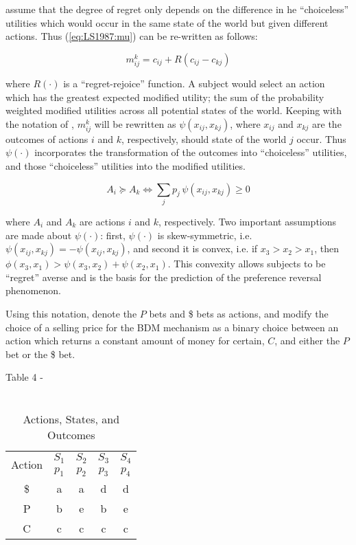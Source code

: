 \documentclass[11pt,a4paper]{report}
\begin{document}
\textcite[809]{Loomes1987} assume that the degree of regret only depends on the difference in  he \enquote{choiceless} utilities which would occur in the same state of the world but given different actions.
Thus (\ref{eq:LS1987:mu}) can be re-written as follows:

\begin{equation}
	\label{eq:LS1987:mu2}
	m^k_{ij} = c_{ij} + R(c_{ij} - c_{kj})
\end{equation}

\noindent where $R(\cdot)$ is a \enquote{regret-rejoice} function. 
A subject would select an action which has the greatest expected modified utility; the sum of the probability weighted modified utilities across all potential states of the world.
Keeping with the notation of \textcite{Loomes1989}, $m^k_{ij}$ will be rewritten as $\psi(x_{ij}, x_{kj})$, where $x_{ij}$ and $x_{kj}$ are the outcomes of actions $i$ and $k$, respectively, should state of the world $j$ occur.
Thus $\psi(\cdot)$ incorporates the transformation of the outcomes into \enquote{choiceless} utilities, and those \enquote{choiceless} utilities into the modified utilities.

\begin{equation}
	\label{eq:LSS1989:mu3}
	A_i \succcurlyeq  A_k \Leftrightarrow \sum_{j} p_j \, \psi ( x_{ij} , x_{kj} ) \geq  0
\end{equation}

\noindent where $A_i$ and $A_k$ are actions $i$ and $k$, respectively.
Two important assumptions are made about $\psi(\cdot)$: first, $\psi(\cdot)$ is skew-symmetric, i.e. $\psi(x_{ij},x_{kj}) = -\psi(x_{ij},x_{kj})$, and second it is convex, i.e. if $x_3 > x_2 > x_1$, then $\phi(x_3,x_1) > \psi(x_3,x_2) + \psi(x_2,x_1)$.
This convexity allows subjects to be \enquote{regret} averse and is the basis for the prediction of the preference reversal phenomenon.

Using this notation, \textcite{Loomes1989} denote the $P$ bets and \$ bets as actions, and modify the choice of a selling price for the BDM mechanism as a binary choice between an action which returns a constant amount of money for certain, $C$, and either the $P$ bet or the \$ bet.

Table 4 -  \textcite{Loomes1989}
\begin{table}[ht]
	\centering
	\caption{ \textcite{Loomes1989} \\ Actions, States, and Outcomes }
	\label{tb:LSS1989:ASO}
	\begin{tabular}{ccccc}
		\multirow{2}{*}{Action} & $S_1$ & $S_2$ & $S_3$ & $S_4$ \\[-.75em]
		                        & $p_1$ & $p_2$ & $p_3$ & $p_4$ \\\hline
		                    \$  &   a   &   a   &   d   &   d   \\
		                    P   &   b   &   e   &   b   &   e   \\
		                    C   &   c   &   c   &   c   &   c   
	\end{tabular}
\end{table}
\end{document}
